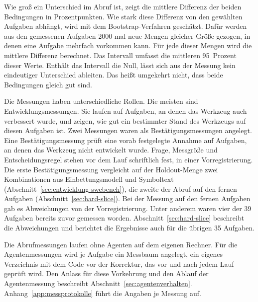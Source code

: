Wie groß ein Unterschied im Abruf ist, zeigt die mittlere Differenz der beiden Bedingungen in Prozentpunkten. Wie stark diese Differenz von den gewählten Aufgaben abhängt, wird mit dem Bootstrap-Verfahren geschätzt. Dafür werden aus den gemessenen Aufgaben 2000-mal neue Mengen gleicher Größe gezogen, in denen eine Aufgabe mehrfach vorkommen kann. Für jede dieser Mengen wird die mittlere Differenz berechnet. Das Intervall umfasst die mittleren 95~Prozent dieser Werte. Enthält das Intervall die Null, lässt sich aus der Messung kein eindeutiger Unterschied ableiten. Das heißt umgekehrt nicht, dass beide Bedingungen gleich gut sind.

Die Messungen haben unterschiedliche Rollen. Die meisten sind Entwicklungsmessungen. Sie laufen auf Aufgaben, an denen das Werkzeug auch verbessert wurde, und zeigen, wie gut ein bestimmter Stand des Werkzeugs auf diesen Aufgaben ist. Zwei Messungen waren als Bestätigungsmessungen angelegt. Eine Bestätigungsmessung prüft eine vorab festgelegte Annahme auf Aufgaben, an denen das Werkzeug nicht entwickelt wurde. Frage, Messgröße und Entscheidungsregel stehen vor dem Lauf schriftlich fest, in einer Vorregistrierung. Die erste Bestätigungsmessung vergleicht auf der Holdout-Menge zwei Kombinationen aus Einbettungsmodell und Symboltext (Abschnitt~\ref{sec:entwicklung-swebench}), die zweite der Abruf auf den fernen Aufgaben (Abschnitt~\ref{sec:hard-slice}). Bei der Messung auf den fernen Aufgaben gab es Abweichungen von der Vorregistrierung. Unter anderem waren vier der 39 Aufgaben bereits zuvor gemessen worden. Abschnitt~\ref{sec:hard-slice} beschreibt die Abweichungen und berichtet die Ergebnisse auch für die übrigen 35 Aufgaben.

Die Abrufmessungen laufen ohne Agenten auf dem eigenen Rechner. Für die Agentenmessungen wird je Aufgabe ein Messbaum angelegt, ein eigenes Verzeichnis mit dem Code vor der Korrektur, das vor und nach jedem Lauf geprüft wird. Den Anlass für diese Vorkehrung und den Ablauf der Agentenmessung beschreibt Abschnitt~\ref{sec:agentenverhalten}. Anhang~\ref{app:messprotokolle} führt die Angaben je Messung auf.

